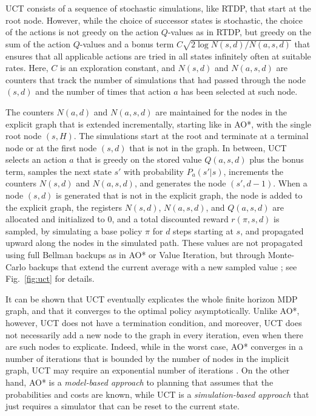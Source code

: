 \documentclass[letterpaper]{article}
\begin{document}
UCT consists of a sequence of stochastic simulations, like RTDP, that start
at the root node. However, while the choice of successor states is stochastic,
the choice of the actions %
is not greedy on the action
$Q$-values as in RTDP, but greedy on the sum of the action $Q$-values and a
bonus term $C\sqrt{2\log N(s,d)/N(a,s,d)}$ that ensures that all applicable
actions are tried in all states infinitely often at suitable rates.
Here, $C$ is an exploration constant, and $N(s,d)$ and $N(a,s,d)$ are counters
that track the number of simulations that had passed through
the node $(s,d)$ and the number of times that action $a$ has been selected
at such node.

The counters $N(a,d)$ and $N(a,s,d)$ are maintained for the  nodes in the explicit graph
that is extended incrementally, starting like in   AO*, with the  single root node $(s,H)$.
The  simulations start  at the root and terminate at a terminal node or at the first node $(s,d)$
that is not in the graph. In between, UCT selects an action $a$ that is greedy on the stored value $Q(a,s,d)$ plus the bonus term,
samples the  next state $s'$ with probability $P_a(s'|s)$, increments the counters $N(s,d)$ and
$N(a,s,d)$, and generates the node $(s',d-1)$. When a node $(s,d)$ is generated that is not in
the explicit graph, the node is added to the explicit graph,  the registers $N(s,d)$, $N(a,s,d)$,
and $Q(a,s,d)$ are allocated and initialized to $0$, and a total discounted reward $r(\pi,s,d)$ is sampled,
by simulating a base policy $\pi$ for $d$ steps starting at $s$, and  %
propagated upward along the nodes in the simulated path. These values
are not propagated using full Bellman backups as in AO* or Value Iteration,
but through Monte-Carlo backups that extend the current average with
a new sampled value \cite{sutton:book}; see Fig.~\ref{fig:uct} for details.

It can be shown that UCT eventually explicates the whole finite horizon MDP
graph, and that it  converges to the optimal policy  asymptotically.
Unlike AO*, however, UCT does not have a termination condition, and moreover,
UCT does not necessarily add a new node to the graph in every iteration, even
when there are such nodes to explicate.
Indeed, while in the worst case, AO* converges in a number of iterations that
is bounded by the number of nodes in the implicit graph, UCT may require an
exponential number of iterations \cite{coquelin-munos,littman:2010}.
On the other hand, AO* is a \emph{model-based approach} to planning that assumes that
the probabilities and costs are known, while UCT is a \emph{simulation-based approach}
that just requires a simulator that can be reset to the current state.
\end{document}
